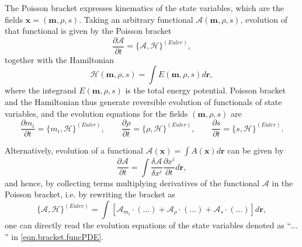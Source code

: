 \documentclass[twoside]{article}
\newcommand{\scH}{\mathscr{H}}
\newcommand{\rr}{{\boldsymbol{r}}}
\newcommand{\mm}{{\boldsymbol{m}}}
\newcommand{\xx}{{\boldsymbol{x}}}
\newcommand{\AF}{\mathscr{A}}
\newcommand{\pd}{\partial}
\newcommand{\IP}[1]{ \textcolor{blue}   {\small\texttt{
\texttt{[image: pin\_small.jpeg]} Ilya: #1}} }
\newcommand{\MP}[1]{ \textcolor{Green}   {\small\texttt{
\texttt{[image: pin\_small.jpeg]} Michal: #1}} }
\begin{document}
The Poisson bracket expresses kinematics of the state variables, which are the 
fields $\xx=(\mm,\rho,s)$. Taking an arbitrary functional $ \AF(\mm,\rho,s) $, 
evolution of that functional is given by the Poisson bracket 
\begin{equation}
\frac{\pd \AF}{\pd t} = \{\AF,\scH\}^{(Euler)},
\end{equation}
together with the Hamiltonian
\begin{equation}
\scH(\mm,\rho,s) = \int E(\mm,\rho,s)d\rr,
\end{equation}
where the integrand $ E(\mm,\rho,s) $ is the total energy potential.
Poisson bracket and the Hamiltonian thus generate reversible evolution of 
functionals of state variables, and the evolution equations for the fields $ 
(\mm,\rho,s) $  are
\begin{equation}\label{eqn.PDE.bracket}
\frac{\pd m_i}{\pd t} = \{m_i,\scH\}^{(Euler)}, \qquad \frac{\pd \rho}{\pd t} = 
\{\rho,\scH\}^{(Euler)}, 
\qquad \frac{\pd s}{\pd t} = \{s,\scH\}^{(Euler)}.
\end{equation}




Alternatively, evolution of a functional $ \AF(\xx) =\int A(\xx)d \rr$ can be 
given by 
\begin{equation}
\frac{\pd \AF}{\pd t} = \int \frac{\delta \AF}{\delta x^i} \frac{\pd 
x^i}{\pd t} d\rr ,
\end{equation}
and hence, by collecting terms multiplying derivatives of the functional $\AF$ 
in the Poisson bracket, i.e. by rewriting the bracket as
\begin{equation}\label{eqn.bracket.funcPDE}
\{\AF,\scH\}^{(Euler)} = \int \left [  \AF_{m_i}\cdot 
(\dots) + \AF_{\rho} \cdot (\dots) + \AF_s \cdot (\dots)\right] d\rr, 
\end{equation}
one can directly read the evolution equations of the state variables denoted as
``$\dots$'' in \eqref{eqn.bracket.funcPDE}.

\end{document}
